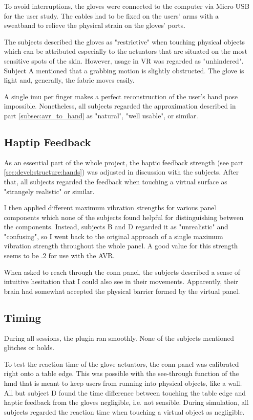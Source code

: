 \documentclass[hyperref, bachelorofscience]{cgvpub}
\begin{document}
To avoid interruptions, the gloves were connected to the computer via Micro USB for the user study. The cables had to be fixed on the users' arms with a sweatband to relieve the physical strain on the gloves' ports.

The subjects described the gloves as "restrictive" when touching physical objects which can be attributed especially to the actuators that are situated on the most sensitive spots of the skin. However, usage in VR was regarded as "unhindered". Subject A mentioned that a grabbing motion is slightly obstructed. The glove is light and, generally, the fabric moves easily. 

A single \acrshort{imu} per finger makes a perfect reconstruction of the user's hand pose impossible. Nonetheless, all subjects regarded the approximation described in part \ref{subsec:avr_to_hand} as "natural", "well usable", or similar.

\subsection{Haptip Feedback}
As an essential part of the whole project, the haptic feedback strength (see part \ref{sec:devel:structure:hands}) was adjusted in discussion with the subjects. After that, all subjects regarded the feedback when touching a virtual surface as "strangely realistic" or similar. 

I then applied different maximum vibration strengths for various panel components which none of the subjects found helpful for distinguishing between the components. Instead, subjects B and D regarded it as "unrealistic" and "confusing", so I went back to the original approach of a single maximum vibration strength throughout the whole panel. A good value for this strength seems to be $ .2 $ for use with the \Gls{AVR}.

When asked to reach through the conn panel, the subjects described a sense of intuitive hesitation that I could also see in their movements. Apparently, their brain had somewhat accepted the physical barrier formed by the virtual panel. 

\subsection{Timing}
During all sessions, the plugin ran smoothly. None of the subjects mentioned glitches or holds. 

To test the reaction time of the glove actuators, the conn panel was calibrated right onto a table edge. This was possible with the see-through function of the \acrshort{hmd} that is meant to keep users from running into physical objects, like a wall. All but subject D found the time difference between touching the table edge and haptic feedback from the gloves negligible, i.e. not sensible. During simulation, all subjects regarded the reaction time when touching a virtual object as negligible.
\end{document}
